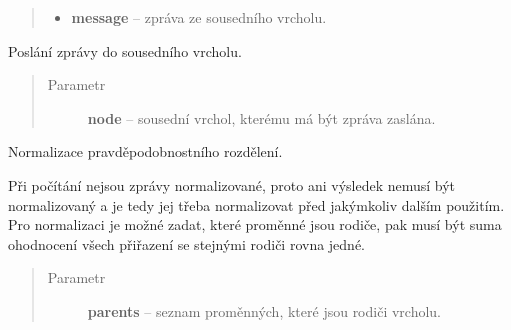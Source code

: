 \begin{fulllineitems}
\begin{fulllineitems}
\begin{quote}
\begin{description}
\begin{itemize}
\item {} 
\textbf{message} -- zpráva ze sousedního vrcholu.

\end{itemize}

\end{description}\end{quote}

\end{fulllineitems}


\begin{fulllineitems}
\label{alex.infer:alex.infer.factor.alex.infer.node.DiscreteFactorNode.message_to}
Poslání zprávy do sousedního vrcholu.
\begin{quote}\begin{description}
\item[{Parametr}] \leavevmode
\textbf{node} -- sousední vrchol, kterému má být zpráva zaslána.

\end{description}\end{quote}

\end{fulllineitems}


\begin{fulllineitems}
\label{alex.infer:alex.infer.factor.alex.infer.node.DiscreteFactorNode.normalize}
Normalizace pravděpodobnostního rozdělení.

Při počítání nejsou zprávy normalizované, proto ani výsledek nemusí být
normalizovaný a je tedy jej třeba normalizovat před jakýmkoliv dalším
použitím. Pro normalizaci je možné zadat, které proměnné jsou rodiče,
pak musí být suma ohodnocení všech přiřazení se stejnými rodiči rovna
jedné.
\begin{quote}\begin{description}
\item[{Parametr}] \leavevmode
\textbf{parents} -- seznam proměnných, které jsou rodiči vrcholu.

\end{description}\end{quote}

\end{fulllineitems}


\end{fulllineitems}

